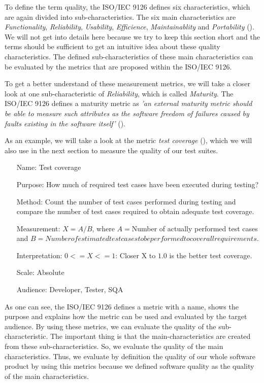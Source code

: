 To define the term quality, the ISO/IEC 9126 defines six characteristics, which are again divided into sub-characteristics. The six main characteristics are \emph{Functionality}, \emph{Reliability}, \emph{Usability}, \emph{Efficience}, \emph{Maintainablity} and \emph{Portability} (\cite{jung2004measuring}). We will not get into details here because we try to keep this section short and the terms should be sufficient to get an intuitive idea about these quality characteristics. The defined sub-characteristics of these main characteristics can be evaluated by the metrics that are proposed within the ISO/IEC 9126. 

To get a better understand of these measurement metrics, we will take a closer look at one sub-characteristic of \emph{Reliability}, which is called \emph{Maturity}. The ISO/IEC 9126 defines a maturity metric as \emph{'an external maturity metric should be able to measure such attributes as the software freedom of failures caused by faults existing in the software itself'} (\cite{ISOIEC9126}).

As an example, we will take a look at the metric \emph{test coverage} (\cite{ISOIEC9126}), which we will also use in the next section to measure the quality of our test suites. 

\begin{itemize}
	\item[Name:] Test coverage
	\item[Purpose:] How much of required test cases have been executed during testing?
	\item[Method:] Count the number of test cases performed during testing and compare the number of test cases required to obtain adequate test coverage.
	\item[Measurement:] $X=A/B$, where $A=$Number of actually performed test cases and $B=Number of estimated test cases to be performed to cover all requirements$.
	\item[Interpretation:] $0<=X<=1$: Closer X to $1.0$ is the better test coverage.
	\item[Scale:] Absolute
	\item[Audience:] Developer, Tester, SQA
\end{itemize}

As one can see, the ISO/IEC 9126 defines a metric with a name, shows the purpose and explains how the metric can be used and evaluated by the target audience. By using these metrics, we can evaluate the quality of the sub-characteristic. The important thing is that the main-characteristics are created from these sub-characteristics. So, we evaluate the quality of the main characteristics. Thus, we evaluate by definition the quality of our whole software product by using this metrics because we defined software quality as the quality of the main characteristics.        

